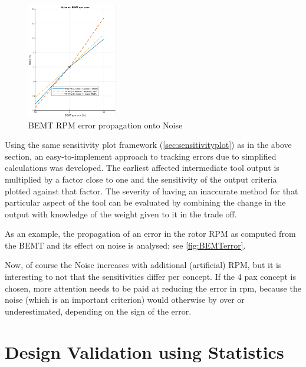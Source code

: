 \begin{figure}
    \centering
    \includegraphics[width=0.35\textwidth]{Figures/NoiseBEMT.PNG}
    \captionsetup{justification=centering}
    \caption{BEMT RPM error propagation onto Noise}
    \label{fig:BEMTerror}
\end{figure}

Using the same sensitivity plot framework (\autoref{sec:sensitivityplot}) as in the above section, an easy-to-implement approach to tracking errors due to simplified calculations was developed. The earliest affected intermediate tool output is multiplied by a factor close to one and the sensitivity of the output criteria plotted against that factor. The severity of having an inaccurate method for that particular aspect of the tool can be evaluated by combining the change in the output with knowledge of the weight given to it in the trade off.

As an example, the propagation of an error in the rotor RPM as computed from the BEMT and its effect on noise is analysed; see \autoref{fig:BEMTerror}.



Now, of course the Noise increases with additional (artificial) RPM, but it is interesting to not that the sensitivities differ per concept. If the 4 pax concept is chosen, more attention needs to be paid at reducing the error in rpm, because the noise (which is an important criterion) would otherwise by over or underestimated, depending on the sign of the error.




\section{Design Validation using Statistics} \label{sec:statsVal}


